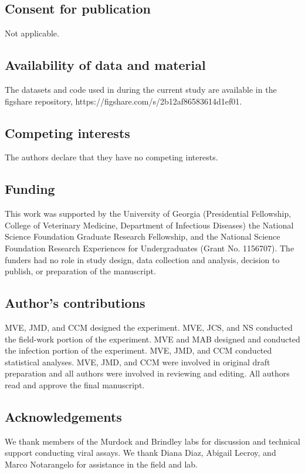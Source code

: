 \documentclass[12pt]{article}
\begin{document}
\subsection*{Consent for publication}
Not applicable.

\subsection*{Availability of data and material}
The datasets and code used in during the current study are available in the figshare repository, https://figshare.com/s/2b12af86583614d1ef01.

\subsection*{Competing interests}
  The authors declare that they have no competing interests.

\subsection*{Funding}
This work was supported by the University of Georgia (Presidential Fellowship, College of Veterinary Medicine, Department of Infectious Diseases) the National Science Foundation Graduate Research Fellowship, and the National Science Foundation Research Experiences for Undergraduates (Grant No. 1156707). The funders had no role in study design, data collection and analysis, decision to publish, or preparation of the manuscript.

\subsection*{Author's contributions}
MVE, JMD, and CCM designed the experiment. MVE, JCS, and NS conducted the field-work portion of the experiment. MVE and MAB designed and conducted the infection portion of the experiment. MVE, JMD, and CCM conducted statistical analyses. MVE, JMD, and CCM were involved in original draft preparation and all authors were involved in reviewing and editing.  All authors read and approve the final manuscript.

\subsection*{Acknowledgements}
We thank members of the Murdock and Brindley labs for discussion and technical support conducting viral assays. We thank Diana Diaz, Abigail Lecroy, and Marco Notarangelo for assistance in the field and lab.
\end{document}
